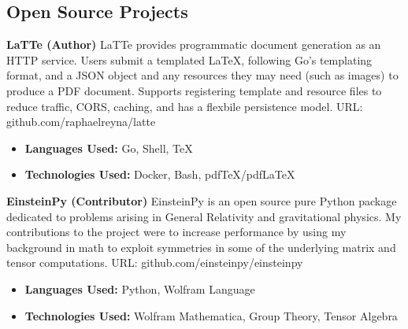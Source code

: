 \documentclass[margin]{./res}
\begin{document}
  

\address{Email: raphaelreyna@protonmail.com \\
  Phone: (626) 384-1342 \\
  Site: www.raphaelreyna.works}
                           
                        
\begin{resume} 
\section{Open Source Projects}

{\bf LaTTe (Author)}\newline
LaTTe provides programmatic document generation as an HTTP service.
Users submit a templated LaTeX, following Go's templating format, and a JSON object and any resources they may need (such as images) to produce
a PDF document. Supports registering template and resource files to reduce traffic, CORS, caching, and has a flexbile persistence model.
URL: github.com/raphaelreyna/latte
\begin{multicols}{2}
\begin{itemize}
\item {\bf Languages Used: }\newline Go, Shell, TeX
  \columnbreak
\item {\bf Technologies Used: }\newline Docker, Bash, pdfTeX/pdfLaTeX
\end{itemize}
\end{multicols}

{\bf EinsteinPy (Contributor)}\newline
EinsteinPy is an open source pure Python package dedicated to problems arising in General Relativity and gravitational physics.
My contributions to the project were to increase performance by using my background in math to exploit symmetries in some of the underlying matrix and tensor computations.
URL: github.com/einsteinpy/einsteinpy
\begin{multicols}{2}
\begin{itemize}
\item {\bf Languages Used: }\newline Python, Wolfram Language
  \columnbreak
\item {\bf Technologies Used: }\newline Wolfram Mathematica, Group Theory, Tensor Algebra
\end{itemize}
\end{multicols}


\end{resume}
\end{document}
